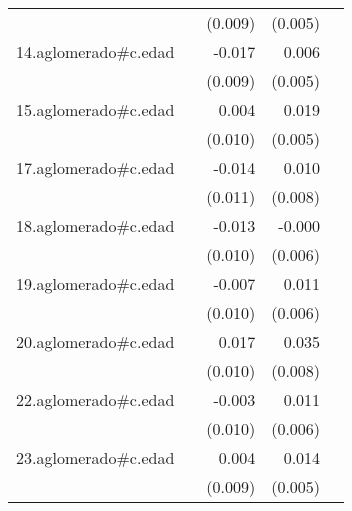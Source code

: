 {\begin{longtable}{l*{4}{D{.}{.}{-1}}}
            &                     &     (0.009)         &     (0.005)         &                     \\
\addlinespace
14.aglomerado#c.edad&                     &      -0.017         &       0.006         &                     \\
            &                     &     (0.009)         &     (0.005)         &                     \\
\addlinespace
15.aglomerado#c.edad&                     &       0.004         &       0.019\sym{***}&                     \\
            &                     &     (0.010)         &     (0.005)         &                     \\
\addlinespace
17.aglomerado#c.edad&                     &      -0.014         &       0.010         &                     \\
            &                     &     (0.011)         &     (0.008)         &                     \\
\addlinespace
18.aglomerado#c.edad&                     &      -0.013         &      -0.000         &                     \\
            &                     &     (0.010)         &     (0.006)         &                     \\
\addlinespace
19.aglomerado#c.edad&                     &      -0.007         &       0.011         &                     \\
            &                     &     (0.010)         &     (0.006)         &                     \\
\addlinespace
20.aglomerado#c.edad&                     &       0.017         &       0.035\sym{***}&                     \\
            &                     &     (0.010)         &     (0.008)         &                     \\
\addlinespace
22.aglomerado#c.edad&                     &      -0.003         &       0.011         &                     \\
            &                     &     (0.010)         &     (0.006)         &                     \\
\addlinespace
23.aglomerado#c.edad&                     &       0.004         &       0.014\sym{*}  &                     \\
            &                     &     (0.009)         &     (0.005)         &                     \\

\end{longtable}}
